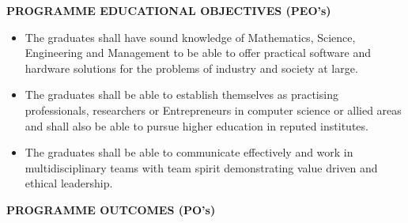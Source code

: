 \begin{center}
\textbf{\fontsize{15}{30}\selectfont PROGRAMME EDUCATIONAL OBJECTIVES (PEO's)}\\
\end{center}

\vspace{1em}


\begin{itemize}
\item The graduates shall have sound knowledge of Mathematics, Science, Engineering
and Management to be able to offer practical software and hardware solutions for
the problems of industry and society at large.
\item The graduates shall be able to establish themselves as practising professionals, researchers or Entrepreneurs in computer science or allied areas and shall also be able to pursue higher education in reputed institutes.
\item The graduates shall be able to communicate effectively and work in multidisciplinary
teams with team spirit demonstrating value driven and ethical leadership.
\end{itemize}







\begin{center}
\textbf{\fontsize{15}{30}\selectfont PROGRAMME OUTCOMES (PO's)}\\
\end{center}
\vspace{1em}

